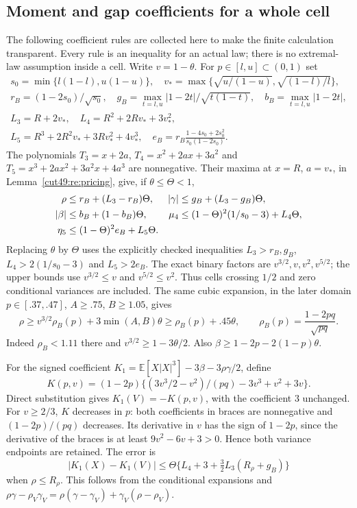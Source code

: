 \documentclass[11pt,a4paper]{article}
\numberwithin{equation}{section}
\theoremstyle{definition}
\theoremstyle{remark}
\newcommand{\E}{\mathbb E}
\begin{document}
\subsection{Moment and gap coefficients for a whole cell}
\label{cut49:mom:conditional-boxes}

The following coefficient rules are collected here to make the finite
calculation transparent. Every rule is an inequality for an actual law;
there is no extremal-law assumption inside a cell.
Write $v=1-\theta$. For $p\in[l,u]\subset(0,1)$ set
\begin{gather*}
 s_0=\min\{l(1-l),u(1-u)\},\quad
 v_* =\max\{\sqrt{u/(1-u)},\sqrt{(1-l)/l}\},\\
 r_B=(1-2s_0)/\sqrt{s_0},\quad
 g_B=\max_{t=l,u}|1-2t|/\sqrt{t(1-t)},\quad b_B=\max_{t=l,u}|1-2t|,\\
 L_3=R+2v_*,\quad L_4=R^2+2Rv_*+3v_*^2,\\
 L_5=R^3+2R^2v_*+3Rv_*^2+4v_*^3,\quad
 e_B=r_B\frac{1-4s_0+2s_0^2}{s_0(1-2s_0)}.
\end{gather*}
The polynomials $T_3=x+2a$, $T_4=x^2+2ax+3a^2$ and
$T_5=x^3+2ax^2+3a^2x+4a^3$ are nonnegative. Their maxima at
$x=R$, $a=v_*$, in Lemma~\ref{cut49:re:pricing}, give, if $\theta\le\Theta<1$,
\begin{align}
 \rho&\le r_B+(L_3-r_B)\Theta,&
 |\gamma|&\le g_B+(L_3-g_B)\Theta,\notag\\
 |\beta|&\le b_B+(1-b_B)\Theta,&
 \mu_4&\le(1-\Theta)^2(1/s_0-3)+L_4\Theta,\notag\\
 \eta_5&\le(1-\Theta)^2e_B+L_5\Theta.&&\label{cut49:mom:boxes}
\end{align}
Replacing $\theta$ by $\Theta$ uses the explicitly checked inequalities
$L_3>r_B,g_B$, $L_4>2(1/s_0-3)$ and $L_5>2e_B$.
The exact binary factors are $v^{3/2},v,v^2,v^{5/2}$; the upper bounds
use $v^{3/2}\le v$ and $v^{5/2}\le v^2$. Thus cells crossing $1/2$ and
zero conditional variances are included. The same cubic expansion, in the
later domain $p\in[.37,.47]$, $A\ge.75$, $B\ge1.05$, gives
\begin{equation}\label{cut49:mom:rho-lower}
 \rho\ge v^{3/2}\rho_B(p)+3\min(A,B)\theta
       \ge\rho_B(p)+.45\theta,\qquad
 \rho_B(p)=\frac{1-2pq}{\sqrt{pq}}.
\end{equation}
Indeed $\rho_B<1.11$ there and $v^{3/2}\ge1-3\theta/2$.
Also $\beta\ge1-2p-2(1-p)\theta$.

For the signed coefficient
$K_1=\E[X|X|^3]-3\beta-3\rho\gamma/2$, define
\[
 K(p,v)=(1-2p)\{(3v^3/2-v^2)/(pq)-3v^3+v^2+3v\}.
\]
Direct substitution gives $K_1(V)=-K(p,v)$, with the coefficient $3$
unchanged. For $v\ge2/3$, $K$ decreases in $p$: both coefficients in
braces are nonnegative and $(1-2p)/(pq)$ decreases. Its derivative in $v$
has the sign of $1-2p$, since the derivative of the braces is at least
$9v^2-6v+3>0$. Hence both variance endpoints are retained. The error is
\begin{equation}\label{cut49:mom:K-error}
 |K_1(X)-K_1(V)|\le
 \Theta\{L_4+3+\tfrac32L_3(R_\rho+g_B)\}
\end{equation}
when $\rho\le R_\rho$. This follows from the conditional expansions and
$\rho\gamma-\rho_V\gamma_V=
\rho(\gamma-\gamma_V)+\gamma_V(\rho-\rho_V)$.
\end{document}
